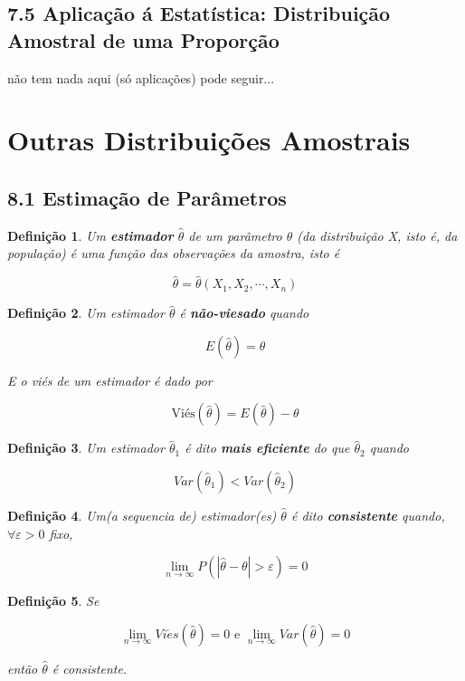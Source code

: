 \documentclass[12pt]{article}
\newtheorem{definition}{Definição}
\begin{document}
\subsection*{7.5 Aplicação á Estatística: Distribuição Amostral de uma Proporção}

não tem nada aqui (só aplicações) pode seguir...

\section{Outras Distribuições Amostrais}
\subsection*{8.1 Estimação de Parâmetros}

\begin{definition}
    Um \textbf{estimador} $\hat{\theta}$ de um parâmetro $\theta$ (da distribuição X, isto é, da população) é uma função das observações da amostra, isto é
    
    $$\hat{\theta} = \hat{\theta}(X_1, X_2, \cdots, X_n)$$
\end{definition}

\begin{definition}
    Um estimador $\hat{\theta}$ é \textbf{não-viesado} quando
    
    $$E(\hat{\theta}) = \theta$$
    
    E o viés de um estimador é dado por
    
    $$\text{Viés} (\hat{\theta}) = E(\hat{\theta}) - \theta$$
\end{definition}

\begin{definition}
    Um estimador $\hat{\theta}_1$ é dito \textbf{mais eficiente} do que $\hat{\theta}_2$ quando
    
    $$Var(\hat{\theta}_1) < Var(\hat{\theta}_2)$$
\end{definition}

\begin{definition}
    Um(a sequencia de) estimador(es) $\hat{\theta}$ é dito \textbf{consistente} quando, $\forall \varepsilon > 0$ fixo,
    
    $$\lim_{n \rightarrow \infty} P(|\hat{\theta} - \theta| > \varepsilon) = 0$$
\end{definition}

\begin{definition}
    Se 
    
    $$\lim_{n \rightarrow \infty} Vi\acute{e}s(\hat{\theta}) = 0 \text{ e } \lim_{n \rightarrow \infty} Var(\hat{\theta}) = 0$$
    
    então $\hat{\theta}$ é consistente.
\end{definition}
\end{document}
